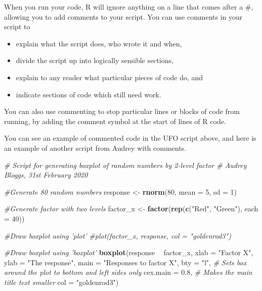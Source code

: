 \documentclass[
]{book}
\newenvironment{Shaded}{\begin{snugshade}}{\end{snugshade}}
\newcommand{\CommentTok}[1]{\textcolor[rgb]{0.56,0.35,0.01}{\textit{#1}}}
\newcommand{\DataTypeTok}[1]{\textcolor[rgb]{0.13,0.29,0.53}{#1}}
\newcommand{\DecValTok}[1]{\textcolor[rgb]{0.00,0.00,0.81}{#1}}
\newcommand{\FloatTok}[1]{\textcolor[rgb]{0.00,0.00,0.81}{#1}}
\newcommand{\KeywordTok}[1]{\textcolor[rgb]{0.13,0.29,0.53}{\textbf{#1}}}
\newcommand{\NormalTok}[1]{#1}
\newcommand{\OperatorTok}[1]{\textcolor[rgb]{0.81,0.36,0.00}{\textbf{#1}}}
\newcommand{\StringTok}[1]{\textcolor[rgb]{0.31,0.60,0.02}{#1}}
\providecommand{\tightlist}{%
  \setlength{\itemsep}{0pt}\setlength{\parskip}{0pt}}
\begin{document}
When you run your code, R will ignore anything on a line that comes after a \#, allowing you to add comments to your script. You can use comments in your script to

\begin{itemize}
\tightlist
\item
  explain what the script does, who wrote it and when,
\item
  divide the script up into logically sensible sections,
\item
  explain to any reader what particular pieces of code do, and
\item
  indicate sections of code which still need work.
\end{itemize}

You can also use commenting to stop particular lines or blocks of code from running, by adding the comment symbol at the start of lines of R code.

You can see an example of commented code in the UFO script above, and here is an example of another script from Audrey with comments.

\begin{Shaded}
\begin{Highlighting}[]
\CommentTok{# Script for generating boxplot of random numbers by 2-level factor}
\CommentTok{# Audrey Bloggs, 31st February 2020}

\CommentTok{#Generate 80 random numbers}
\NormalTok{response <-}\StringTok{ }\KeywordTok{rnorm}\NormalTok{(}\DecValTok{80}\NormalTok{, }\DataTypeTok{mean =} \DecValTok{5}\NormalTok{, }\DataTypeTok{sd =} \DecValTok{1}\NormalTok{)}

\CommentTok{#Generate factor with two levels}
\NormalTok{factor_x <-}\StringTok{ }\KeywordTok{factor}\NormalTok{(}\KeywordTok{rep}\NormalTok{(}\KeywordTok{c}\NormalTok{(}\StringTok{"Red"}\NormalTok{, }\StringTok{"Green"}\NormalTok{), }\DataTypeTok{each =} \DecValTok{40}\NormalTok{))}

\CommentTok{#Draw boxplot using 'plot'}
\CommentTok{#plot(factor_x, response, col = "goldenrod3")}

\CommentTok{#Draw boxplot using 'boxplot'}
\KeywordTok{boxplot}\NormalTok{(response }\OperatorTok{~}\StringTok{ }\NormalTok{factor_x, }
        \DataTypeTok{xlab =} \StringTok{"Factor X"}\NormalTok{,}
        \DataTypeTok{ylab =} \StringTok{"The response"}\NormalTok{,}
        \DataTypeTok{main =} \StringTok{"Responses to factor X"}\NormalTok{,}
        \DataTypeTok{bty =} \StringTok{"l"}\NormalTok{,  }\CommentTok{# Sets box around the plot to bottom and left sides only}
        \DataTypeTok{cex.main =} \FloatTok{0.8}\NormalTok{,  }\CommentTok{# Makes the main title text smaller}
        \DataTypeTok{col =} \StringTok{"goldenrod3"}\NormalTok{)}
\end{Highlighting}
\end{Shaded}
\end{document}
